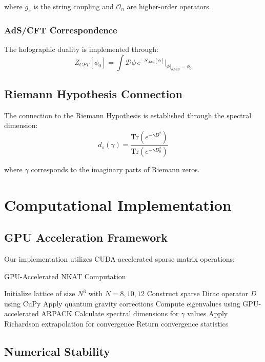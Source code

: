 \documentclass[12pt,a4paper]{article}
\begin{document}
where $g_s$ is the string coupling and $\mathcal{O}_n$ are higher-order operators.

\subsubsection{AdS/CFT Correspondence}
The holographic duality is implemented through:
\begin{equation}
Z_{CFT}[\phi_0] = \int \mathcal{D}\phi \, e^{-S_{AdS}[\phi]} \Big|_{\phi|_{\partial AdS} = \phi_0}
\end{equation}

\subsection{Riemann Hypothesis Connection}

The connection to the Riemann Hypothesis is established through the spectral dimension:
\begin{equation}
d_s(\gamma) = \frac{\text{Tr}(e^{-\gamma D^2})}{\text{Tr}(e^{-\gamma D_0^2})}
\end{equation}

where $\gamma$ corresponds to the imaginary parts of Riemann zeros.

\section{Computational Implementation}

\subsection{GPU Acceleration Framework}

Our implementation utilizes CUDA-accelerated sparse matrix operations:

\begin{algorithm}
\caption{GPU-Accelerated NKAT Computation}
\begin{algorithmic}[1]
\STATE Initialize lattice of size $N^3$ with $N = 8, 10, 12$
\STATE Construct sparse Dirac operator $D$ using CuPy
\STATE Apply quantum gravity corrections
\STATE Compute eigenvalues using GPU-accelerated ARPACK
\STATE Calculate spectral dimensions for $\gamma$ values
\STATE Apply Richardson extrapolation for convergence
\STATE Return convergence statistics
\end{algorithmic}
\end{algorithm}

\subsection{Numerical Stability}
\end{document}
